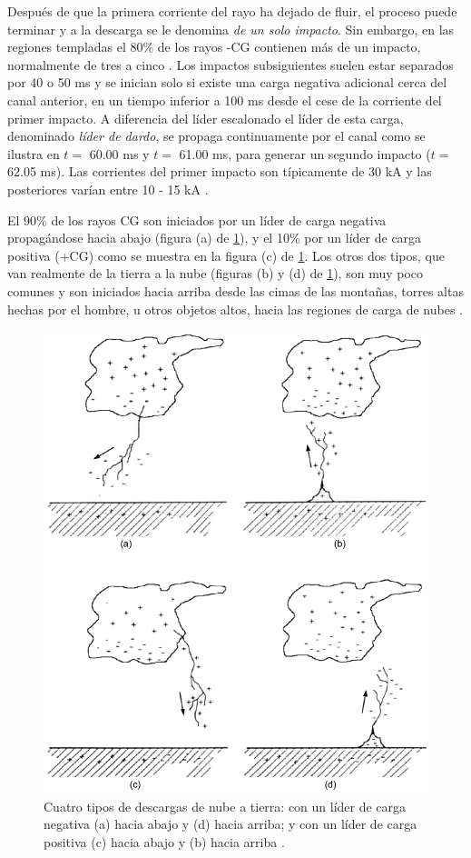 \documentclass[12pt,oneside,openany,letter]{book}
\begin{document}
Después de que la primera corriente del rayo ha dejado de fluir, el proceso puede terminar y a la descarga se le denomina \textit{de un solo impacto}. Sin embargo, en las regiones templadas el 80\% de los rayos -CG contienen más de un impacto, normalmente de tres a cinco \cite{DwyerUman2014}. Los impactos subsiguientes suelen estar separados por 40 o 50 ms y se inician solo si existe una carga negativa adicional cerca del canal anterior, en un tiempo inferior a 100 ms desde el cese de la corriente del primer impacto. A diferencia del líder escalonado el l\'ider de esta carga, denominado \textit{líder de dardo}, se propaga continuamente por el canal como se ilustra en $t=$ 60.00 ms y $t=$ 61.00 ms, para generar un segundo impacto ($t=$ 62.05 ms). Las corrientes del primer impacto son típicamente de 30 kA y las posteriores varían entre 10 - 15 kA \cite{DwyerUman2014}.

El 90\% de los rayos CG son iniciados por un l\'ider de carga negativa propagándose hacia abajo  (figura (a) de \ref{fig:CG4}), y el 10\% por un l\'ider de carga positiva (+CG) como se muestra en la figura (c) de \ref{fig:CG4}. Los otros dos tipos, que van realmente de la tierra a la nube (figuras (b) y (d) de \ref{fig:CG4}), son muy poco comunes y son iniciados hacia arriba desde las cimas de las montañas, torres altas hechas por el hombre, u otros objetos altos, hacia las regiones de carga de nubes \cite{DwyerUman2014}.

\begin{figure}
    \centering
    \includegraphics[scale=0.5]{figures/CG4.png}
    \caption[]{Cuatro tipos de descargas de nube a tierra: con un l\'ider de carga negativa (a) hacia abajo y (d) hacia arriba; y con un l\'ider de carga positiva (c) hacia abajo y (b) hacia arriba \cite{DwyerUman2014}. }
    \label{fig:CG4}
\end{figure}
\end{document}
